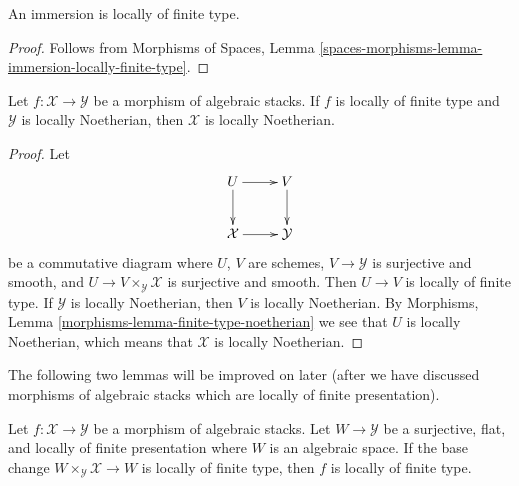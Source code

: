 \begin{lemma}
\label{lemma-immersion-locally-finite-type}
An immersion is locally of finite type.
\end{lemma}

\begin{proof}
Follows from
Morphisms of Spaces,
Lemma \ref{spaces-morphisms-lemma-immersion-locally-finite-type}.
\end{proof}

\begin{lemma}
\label{lemma-locally-finite-type-locally-noetherian}
Let $f : \mathcal{X} \to \mathcal{Y}$ be a morphism of algebraic stacks.
If $f$ is locally of finite type and $\mathcal{Y}$ is locally Noetherian,
then $\mathcal{X}$ is locally Noetherian.
\end{lemma}

\begin{proof}
Let
$$
\xymatrix{
U \ar[d] \ar[r] & V \ar[d] \\
\mathcal{X} \ar[r] & \mathcal{Y}
}
$$
be a commutative diagram where $U$, $V$ are schemes,
$V \to \mathcal{Y}$ is surjective and smooth, and
$U \to V \times_\mathcal{Y} \mathcal{X}$ is surjective and smooth.
Then $U \to V$ is locally of finite type. If $\mathcal{Y}$ is
locally Noetherian, then $V$ is locally Noetherian. By
Morphisms, Lemma \ref{morphisms-lemma-finite-type-noetherian}
we see that $U$ is locally Noetherian, which means that $\mathcal{X}$
is locally Noetherian.
\end{proof}

\noindent
The following two lemmas will be improved on later (after we have discussed
morphisms of algebraic stacks which are locally of finite presentation).

\begin{lemma}
\label{lemma-check-finite-type-covering}
Let $f : \mathcal{X} \to \mathcal{Y}$ be a morphism of algebraic stacks.
Let $W \to \mathcal{Y}$ be a surjective, flat, and locally of finite
presentation where $W$ is an algebraic space. If the base change
$W \times_\mathcal{Y} \mathcal{X} \to W$ is
locally of finite type, then $f$ is locally of finite type.
\end{lemma}

